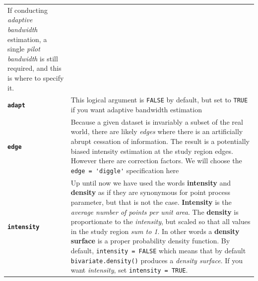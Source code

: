 \documentclass[
]{book}
\newcommand{\passthrough}[1]{#1}
\begin{document}
\begin{longtable}[]{@{}ll@{}}
\begin{minipage}[t]{0.78\columnwidth}
If conducting \emph{adaptive bandwidth} estimation, a single \emph{pilot bandwidth} is still required, and this is where to specify it.\strut
\end{minipage}\tabularnewline
\begin{minipage}[t]{0.16\columnwidth}\raggedright
\textbf{\passthrough{\lstinline!adapt!}}\strut
\end{minipage} & \begin{minipage}[t]{0.78\columnwidth}\raggedright
This logical argument is \passthrough{\lstinline!FALSE!} by default, but set to \passthrough{\lstinline!TRUE!} if you want adaptive bandwidth estimation\strut
\end{minipage}\tabularnewline
\begin{minipage}[t]{0.16\columnwidth}\raggedright
\textbf{\passthrough{\lstinline!edge!}}\strut
\end{minipage} & \begin{minipage}[t]{0.78\columnwidth}\raggedright
Because a given dataset is invariably a subset of the real world, there are likely \emph{edges} where there is an artificially abrupt cessation of information. The result is a potentially biased intensity estimation at the study region edges. However there are correction factors. We will choose the \passthrough{\lstinline!edge = 'diggle'!} specification here\strut
\end{minipage}\tabularnewline
\begin{minipage}[t]{0.16\columnwidth}\raggedright
\textbf{\passthrough{\lstinline!intensity!}}\strut
\end{minipage} & \begin{minipage}[t]{0.78\columnwidth}\raggedright
Up until now we have used the words \textbf{intensity} and \textbf{density} as if they are synonymous for point process parameter, but that is not the case. \textbf{Intensity} is the \emph{average number of points per unit area}. The \textbf{density} is proportionate to the \emph{intensity}, but scaled so that all values in the study region \emph{sum to 1}. In other words a \textbf{density surface} is a proper probability density function. By default, \passthrough{\lstinline!intensity = FALSE!} which means that by default \passthrough{\lstinline!bivariate.density()!} produces a \emph{density surface}. If you want \emph{intensity}, set \passthrough{\lstinline!intensity = TRUE!}.\strut
\end{minipage}\tabularnewline
\bottomrule
\end{longtable}
\end{document}
